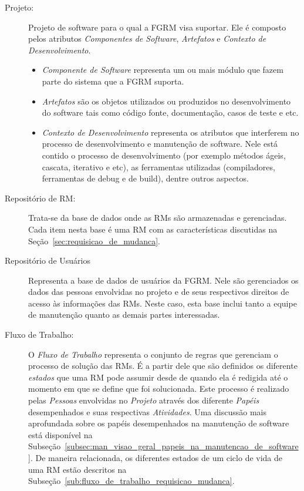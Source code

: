 \begin{description}
	\item[Projeto:] Projeto de software para o qual a FGRM visa suportar.
		Ele é composto pelos atributos \textit{Componentes de Software},
		\textit{Artefatos} e \textit{Contexto de Desenvolvimento}.
		\begin{itemize}
			\item  \textit{Componente de Software} representa um ou mais módulo
				que fazem parte do sistema que a FGRM suporta.
			\item \textit{Artefatos} são os objetos utilizados ou produzidos no
				desenvolvimento do software tais como código fonte,
				documentação, casos de teste e etc.
			\item \textit{Contexto de Desenvolvimento} representa os atributos
				que interferem no processo de desenvolvimento e manutenção de
				software. Nele está contido o processo de desenvolvimento (por
				exemplo métodos ágeis, cascata, iterativo e etc), as ferramentas
				utilizadas (compiladores, ferramentas de debug e de build), dentre
                outros aspectos.
		\end{itemize}
	\item[Repositório de RM:] Trata-se da base de dados onde as RMs são
		armazenadas e gerenciadas. Cada item nesta base é uma RM com as
		características discutidas na Seção~\ref{sec:requisicao_de_mudanca}.
    \item[Repositório de Usuários] Representa a base de dados de usuários da
        FGRM\@. Nele são gerenciados os dados das pessoas envolvidas no projeto
        e de seus respectivos direitos de acesso às informações das RMs. Neste
        caso, esta base inclui tanto a equipe de manutenção quanto as demais
        partes interessadas.
	\item[Fluxo de Trabalho:] O \textit{Fluxo de Trabalho} representa o conjunto
		de regras que gerenciam o processo de solução das RMs\@. É a partir
		dele que são definidos os diferente \textit{estados} que uma RM pode
		assumir desde de quando ela é redigida até o momento em que se define
		que foi solucionada. Este processo é realizado pelas \textit{Pessoas}
		envolvidas no \textit{Projeto} através dos diferente \textit{Papéis}
		desempenhados e suas respectivas \textit{Atividades}. Uma discussão mais
		aprofundada sobre os papéis desempenhados na manutenção de software está
		disponível na
		Subseção~\ref{subsec:man_visao_geral_papeis_na_manutencao_de_software}.
		De maneira relacionada, os diferentes estados de um ciclo de vida de uma
		RM estão descritos na
		Subseção~\ref{sub:fluxo_de_trabalho_requisicao_mudanca}.
\end{description}

